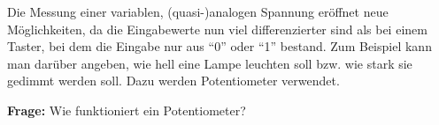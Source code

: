 Die Messung einer variablen, (quasi-)analogen Spannung eröffnet neue Möglichkeiten, da die Eingabewerte nun viel differenzierter sind als bei einem Taster, bei dem die Eingabe nur aus \enquote{0} oder \enquote{1} bestand. Zum Beispiel kann man darüber angeben, wie hell eine Lampe leuchten soll bzw. wie stark sie gedimmt werden soll. Dazu werden Potentiometer verwendet.

\begin{ziel}
	\textbf{Frage:} Wie funktioniert ein Potentiometer?
\end{ziel}

